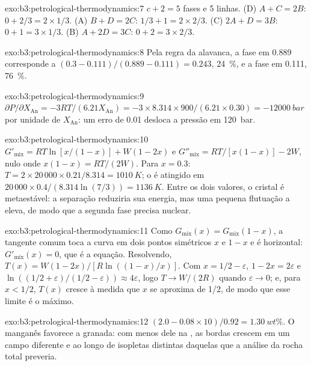 \begin{solution}{exo:b3:petrological-thermodynamics:7}
$c + 2 = 5$ fases e 5 linhas. (D) $A + C = 2B$: $0 + 2/3 = 2\times1/3$. (A)
$B + D = 2C$: $1/3 + 1 = 2\times2/3$. (C) $2A + D = 3B$: $0 + 1 = 3\times1/3$.
(B) $A + 2D = 3C$: $0 + 2 = 3\times2/3$.
\end{solution}

\begin{solution}{exo:b3:petrological-thermodynamics:8}
Pela regra da alavanca, a fase em 0.889 corresponde a $(0.3 - 0.111)/(0.889 - 0.111) =
0.243$, \qty{24}{\percent}, e a fase em 0.111, \qty{76}{\percent}.
\end{solution}

\begin{solution}{exo:b3:petrological-thermodynamics:9}
$\partial P/\partial X_{\text{An}} = -3RT/(6.21X_{\text{An}}) =
-3\times8.314\times900/(6.21\times0.30) = \qty{-12000}{bar}$ por unidade de
$X_{\text{An}}$: um erro de 0.01 desloca a pressão em \qty{120}{bar}.
\end{solution}

\begin{solution}{exo:b3:petrological-thermodynamics:10}
$G'_{\text{mix}} = RT\ln[x/(1 - x)] + W(1 - 2x)$ e $G''_{\text{mix}} =
RT/[x(1 - x)] - 2W$, nulo onde $x(1 - x) = RT/(2W)$. Para $x = 0.3$: $T =
2\times20\,000\times0.21/8.314 = \qty{1010}{K}$; o  é atingido em
$20\,000\times0.4/(8.314\ln(7/3)) = \qty{1136}{K}$. Entre os dois valores, o
cristal é metaestável: a separação reduziria sua energia, mas uma pequena
flutuação a eleva, de modo que a segunda fase precisa nuclear.
\end{solution}

\begin{solution}{exo:b3:petrological-thermodynamics:11}
Como $G_{\text{mix}}(x) = G_{\text{mix}}(1 - x)$, a tangente comum toca a curva
em dois pontos simétricos $x$ e $1 - x$ e é horizontal:
$G'_{\text{mix}}(x) = 0$, que é a equação. Resolvendo, $T(x) = W(1 -
2x)/[R\ln((1 - x)/x)]$. Com $x = 1/2 - \varepsilon$, $1 - 2x = 2\varepsilon$
e $\ln((1/2 + \varepsilon)/(1/2 - \varepsilon)) \approx 4\varepsilon$, logo
$T \to W/(2R)$ quando $\varepsilon \to 0$; e, para $x < 1/2$, $T(x)$ cresce à
medida que $x$ se aproxima de 1/2, de modo que esse limite é o máximo.
\end{solution}

\begin{solution}{exo:b3:petrological-thermodynamics:12}
$(2.0 - 0.08\times10)/0.92 = \qty{1.30}{wt\percent}$. O manganês favorece a
granada: com menos dele na , as bordas crescem em um
campo diferente e ao longo de isopletas distintas daquelas que a análise da
rocha total preveria.
\end{solution}

